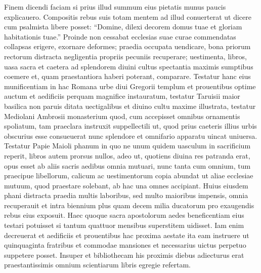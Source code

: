 \documentclass[a5paper,twoside]{article}
\begin{document}
Finem dicendi faciam si prius illud summum eius pietatis munus paucis explicauero.  Compositis rebus suis totam mentem ad illud conuerterat ut dicere cum psalmista libere posset: ``Domine, dilexi decorem domus tuae et gloriam habitationis tuae.''  Proinde non cessabat ecclesias suae curae commendatas collapsas erigere, exornare deformes; praedia occupata uendicare, bona priorum rectorum distracta negligentia propriis pecuniis recuperare; uestimenta, libros, uasa sacra et caetera ad splendorem diuini cultus spectantia maximis sumptibus coemere et, quam praestantiora haberi poterant, comparare.  Testatur hanc eius munificentiam in hac Romana urbe diui Gregorii templum et prouentibus optime auctum et aedificiis perquam magnifice instauratum, testatur Taruisii maior basilica non paruis ditata uectigalibus et diuino cultu maxime illustrata, testatur Mediolani Ambrosii monasterium quod, cum accepisset omnibus ornamentis spoliatum, tam praeclara instruxit suppellectili ut, quod prius caeteris illius urbis obscurius esse consueuerat nunc splendore et omnifario apparatu uincat uniuersa. Testatur Papie Maioli phanum in quo ne unum quidem uasculum in sacrificium reperit, libros autem prorsus nullos, adeo ut, quotiens diuina res patranda erat, opus esset ab aliis sacris aedibus omnia mutuari, nunc tanta cum omnium, tum praecipue libellorum, calicum ac uestimentorum copia abundat ut aliae ecclesiae mutuum, quod praestare solebant, ab hac una omnes accipiant.  Huius eiusdem phani distracta praedia multis laboribus, sed multo maioribus impensis, omnia recuperauit et intra biennium plus quam decem milia ducatorum pro exaugendis rebus eius exposuit.  Haec quoque sacra apostolorum aedes beneficentiam eius testari potuisset si tantum quattuor mensibus superstitem uidisset.  Iam enim decreuerat et aedificiis et prouentibus hac proxima aestate ita eam instruere ut quinquaginta fratribus et commodae mansiones et necessarius uictus perpetuo suppetere posset.  Insuper et bibliothecam his proximis diebus adiecturus erat praestantissimis omnium scientiarum libris egregie refertam.

\endnumbering
\end{document}
